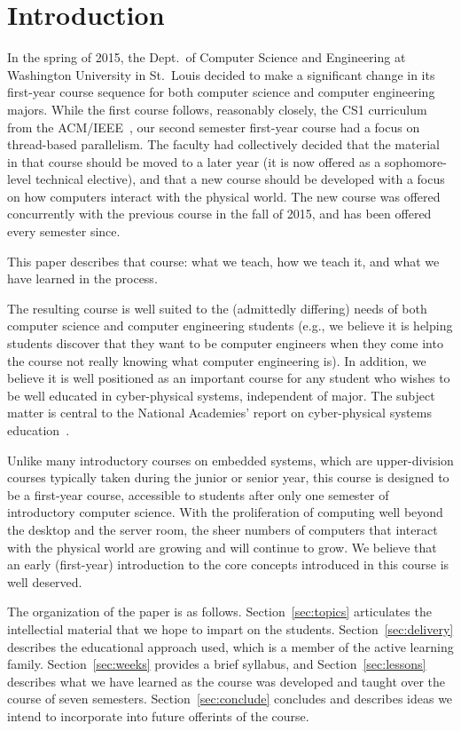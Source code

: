 \section{Introduction}
\label{sec:intro}

In the spring of 2015, the Dept.~of Computer Science and Engineering at
Washington University in St.~Louis decided to make a significant change
in its first-year course sequence for both computer science and
computer engineering majors.  While the first course follows, reasonably
closely, the CS1 curriculum from the ACM/IEEE~\cite{cs13}, our second semester
first-year course had a focus on thread-based parallelism.  The faculty
had collectively decided that the material in that course should be moved
to a later year (it is now offered as a sophomore-level technical elective),
and that a new course should be developed with a focus on how computers
interact with the physical world.
The new course was offered concurrently with the previous course in the
fall of 2015, and has been offered every semester since.

This paper describes that course: what we teach, how we teach it, and
what we have learned in the process.

The resulting course is well suited to the (admittedly differing) needs of
both computer science and computer
engineering students (e.g., we believe it is helping students discover
that they want to be computer engineers when they come into the course
not really knowing what computer engineering is).
In addition, we believe it is well positioned as an important course for
any student who wishes to be well educated in cyber-physical systems,
independent of major.
The subject matter is central to the National Academies' report on
cyber-physical systems education~\cite{nasem16}.

Unlike many introductory courses on embedded systems, which are upper-division
courses typically taken during the junior or senior year, this course is
designed to be a first-year course, accessible to students after only
one semester of introductory computer science.  With the proliferation of
computing well beyond the desktop and the server room, the sheer numbers
of computers that interact with the physical world are growing and
will continue to grow.
We believe that an early (first-year) introduction to the core concepts
introduced in this course is well deserved.

The organization of the paper is as follows.  Section~\ref{sec:topics}
articulates the intellectial material that we hope to impart on the
students.  
Section~\ref{sec:delivery} describes the educational approach used,
which is a member of the active learning family.
Section~\ref{sec:weeks} provides a brief syllabus, and
Section~\ref{sec:lessons} describes what we have learned as the course
was developed and taught over the course of seven semesters.
Section~\ref{sec:conclude} concludes and describes ideas we intend
to incorporate into future offerints of the course.
